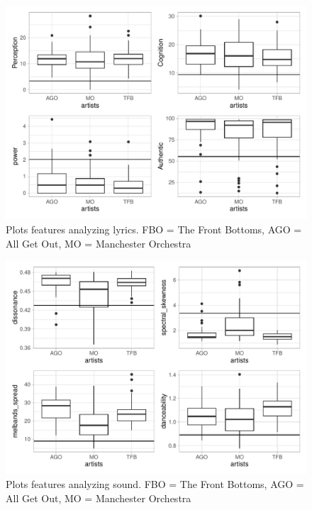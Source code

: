 \documentclass{article}\usepackage[]{graphicx}\usepackage[]{xcolor}
\begin{document}
\begin{multicols}{2}
   \begin{figure}[H]
    \begin{center}
       \includegraphics[scale=0.5]{lyrics.pdf}
       \caption{Plots features analyzing lyrics. FBO = The Front Bottoms, AGO = 
       All Get Out, MO = Manchester Orchestra}
     \label{lyrics_plot}
     \end{center}
   \end{figure}
   \begin{figure}[H]
    \begin{center}
       \includegraphics[scale=0.5]{sound1.pdf}
       \caption{Plots features analyzing sound. FBO = The Front Bottoms, AGO = 
       All Get Out, MO = Manchester Orchestra}
     \label{sound1}
     \end{center}
   \end{figure}

\end{multicols}
\end{document}
